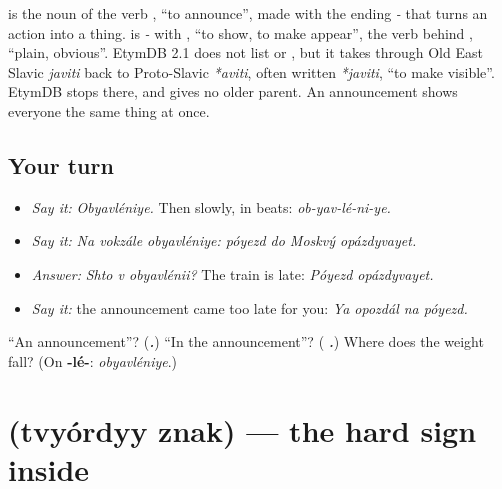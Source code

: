 \begin{cousinweb}
\textbf{} is the noun of the verb \emph{}, \textquotedblleft{}to announce\textquotedblright{}, made with the ending \emph{-} that turns an action into a thing. \emph{} is \emph{-} with \textbf{}, \textquotedblleft{}to show, to make appear\textquotedblright{}, the verb behind \emph{}, \textquotedblleft{}plain, obvious\textquotedblright{}. EtymDB 2.1 does not list \emph{} or \emph{}, but it takes \emph{} through Old East Slavic \emph{javiti} back to Proto-Slavic \emph{*aviti}, often written \emph{*javiti}, \textquotedblleft{}to make visible\textquotedblright{}. EtymDB stops there, and gives no older parent. An announcement shows everyone the same thing at once.
\end{cousinweb}

\subsection*{Your turn}
\begin{itemize}
\raggedright
  \item \emph{Say it:} \emph{Obyavléniye.} Then slowly, in beats: \emph{ob-yav-lé-ni-ye.}
  \item \emph{Say it:} \emph{Na vokzále obyavléniye: póyezd do Moskvý opázdyvayet.}
  \item \emph{Answer:} \emph{Shto v obyavlénii?} The train is late: \emph{Póyezd opázdyvayet.}
  \item \emph{Say it:} the announcement came too late for you: \emph{Ya opozdál na póyezd.}
\end{itemize}

\begin{tcolorbox}[breakable,colback=teal!4,colframe=teal!35!black,title={Before you move on}]
\textquotedblleft{}An announcement\textquotedblright{}? (\emph{\textbf{.}}) \textquotedblleft{}In the announcement\textquotedblright{}? (\emph{\textbf{ .}}) Where does the weight fall? (On \textbf{-lé-}: \emph{obyavléniye}.)
\end{tcolorbox}
\section[\texorpdfstring{\ru{ъ} (tvyórdyy znak)}{ъ (tvyórdyy znak)}]{ (tvyórdyy znak) — the hard sign inside }

\label{lesson:RU-W266-tvyordyy-znak}



